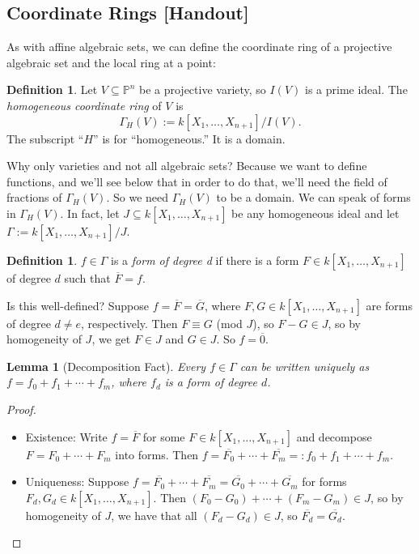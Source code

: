 \documentclass[12pt]{article}
\newcommand{\ita}[1]{\textit{#1}}
\newtheorem{lemma}[theorem]{Lemma}
\theoremstyle{definition}
\newtheorem{definition}[theorem]{Definition}
\begin{document}
\subsection{Coordinate Rings [Handout]}
As with affine algebraic sets, we can define the coordinate ring of a projective algebraic set and the local ring at a point:
\begin{definition}
    Let $V\subseteq\mathbb{P}^n$ be a projective variety, so $I(V)$ is a prime ideal. The \ita{homogeneous coordinate ring} of $V$ is 
    \begin{equation}
        \Gamma_H(V):=k[X_1,\dotsc,X_{n+1}]/I(V).
    \end{equation}
    The subscript ``$H$'' is for ``homogeneous.'' It  is a domain.
\end{definition}
Why only varieties and not all algebraic sets? Because we want to define functions, and we'll see below that in order to do that, we'll need the field of fractions of $\Gamma_H(V)$. So we need $\Gamma_H(V)$ to be a domain. We can speak of forms in $\Gamma_H(V)$. In fact, let $J\subseteq k[X_1,\dotsc,X_{n+1}]$ be any homogeneous ideal and let $\Gamma:=k[X_1,\dotsc,X_{n+1}]/J$.
\begin{definition}
    $f\in\Gamma$ is a \ita{form of degree d} if there is a form $F\in k[X_1,\dotsc,X_{n+1}]$ of degree $d$ such that $\overline{F}=f$.
\end{definition}
Is this well-defined? Suppose $f=\overline{F}=\overline{G}$, where $F,G\in k[X_1,\dotsc,X_{n+1}]$ are forms of degree $d\neq e$, respectively. Then $F\equiv G$ (mod $J$), so $F-G\in J$, so by homogeneity of $J$, we get $F\in J$ and $G\in J$. So $f=\overline{0}$.
\begin{lemma}[Decomposition Fact]
    Every $f\in\Gamma$ can be written uniquely as $f=f_0+f_1+\dotsb+f_m$, where $f_d$ is a form of degree $d$.
\end{lemma}
\begin{proof}
    \begin{itemize}
        \item Existence: Write $f=\overline{F}$ for some $F\in k[X_1,\dotsc,X_{n+1}]$ and decompose $F=F_0+\dotsb+F_m$ into forms. Then $f=\overline{F_0}+\dotsb+\overline{F_m}=:f_0+f_1+\dotsb+f_m$.
        \item Uniqueness: Suppose $f=\overline{F_0}+\dotsb+\overline{F_m}=\overline{G_0}+\dotsb+\overline{G_m}$ for forms $F_d,G_d\in k[X_1,\dotsc,X_{n+1}]$. Then $(F_0-G_0)+\dotsb+(F_m-G_m)\in J$, so by homogeneity of $J$, we have that all $(F_d-G_d)\in J$, so $\overline{F_d}=\overline{G_d}$.
    \end{itemize}
\end{proof}
\end{document}
